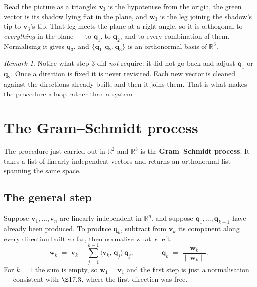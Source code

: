 \documentclass[11pt]{article}
\theoremstyle{plain}
\theoremstyle{definition}
\theoremstyle{remark}
\newtheorem*{rmk}{Remark}
\newcommand{\R}{\mathbb{R}}
\newcommand{\vc}[1]{\mathbf{#1}}
\newcommand{\norm}[1]{\lVert #1\rVert}
\newcommand{\ip}[2]{\langle #1,\, #2\rangle}
\begin{document}
\noindent Read the picture as a triangle: $\vc{v}_{3}$ is the hypotenuse from
the origin, the green vector is its shadow lying flat in the plane, and
$\vc{w}_{3}$ is the leg joining the shadow's tip to $\vc{v}_{3}$'s tip. That leg
meets the plane at a right angle, so it is orthogonal to \emph{everything} in
the plane --- to $\vc{q}_{1}$, to $\vc{q}_{2}$, and to every combination of
them. Normalising it gives $\vc{q}_{3}$, and
$\{\vc{q}_{1},\vc{q}_{2},\vc{q}_{3}\}$ is an orthonormal basis of $\R^{3}$.

\begin{rmk}
Notice what step 3 did \emph{not} require: it did not go back and adjust
$\vc{q}_{1}$ or $\vc{q}_{2}$. Once a direction is fixed it is never revisited.
Each new vector is cleaned against the directions already built, and then it
joins them. That is what makes the procedure a loop rather than a system.
\end{rmk}

\section{The Gram--Schmidt process}
The procedure just carried out in $\R^{2}$ and $\R^{3}$ is the
\textbf{Gram--Schmidt process}. It takes a list of linearly independent vectors
and returns an orthonormal list spanning the same space.

\subsection{The general step}
Suppose $\vc{v}_{1},\dots,\vc{v}_{n}$ are linearly independent in $\R^{n}$, and
suppose $\vc{q}_{1},\dots,\vc{q}_{k-1}$ have already been produced. To produce
$\vc{q}_{k}$, subtract from $\vc{v}_{k}$ its component along every direction
built so far, then normalise what is left:
\begin{equation}\label{eq:gs}
  \vc{w}_{k} \;=\; \vc{v}_{k}
    - \sum_{j=1}^{k-1}\ip{\vc{v}_{k}}{\vc{q}_{j}}\,\vc{q}_{j},
  \qquad\qquad
  \vc{q}_{k} \;=\; \frac{\vc{w}_{k}}{\norm{\vc{w}_{k}}} .
\end{equation}
For $k=1$ the sum is empty, so $\vc{w}_{1}=\vc{v}_{1}$ and the first step is
just a normalisation --- consistent with $\S17.3$, where the first direction was
free.
\end{document}
